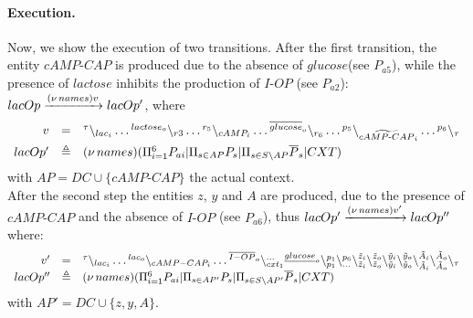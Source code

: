 \paragraph{Execution.}
Now, we show  the execution of two transitions. 
After the first transition, the entity $cAMP\textrm{-}CAP$ is produced due to the absence of  $glucose$(see $P_{a5}$), while the presence of $lactose$ inhibits the production of $I\textrm{-}OP$ (see $P_{a2}$): $lacOp \xrightarrow{(\nu\, names) v} lacOp'$,
where
{\small
$$
\begin{array}{rcl}
v & = & {}^{\tau} \backslash_{lac_i}\dots {}^{lactose_o} \backslash_{r3}\dots
 {}^{r_5} \backslash_{cAMP_i}\dots
  {}^{\overline{glucose}_o} \backslash_{r_6}
\dots {}^{p_5} \backslash_{\widetilde{cAMP\textrm{-}CAP}_i}\dots {}^{p_6} \backslash_{\tau}\\[5pt]
lacOp' & \triangleq & (\nu\, names) (\Pi_{i =1}^6 P_{ai} | \Pi_{s \in AP} P_s |   \Pi_{s \in S \backslash AP} \overline{P}_s| CXT)
\end{array}
$$ 
}
with $AP= DC\cup \{cAMP\textrm{-}CAP\}$  the actual context.\\
After the second step the entities $z$, $y$ and $A$ are produced, due to the presence of $cAMP\textrm{-}CAP$ and the absence of $I\textrm{-}OP$ (see $P_{a6}$), thus
$lacOp' \xrightarrow{(\nu\, names)v'} lacOp''$
where:
{\small
$$
\begin{array}{rcl}
v' & = & {}^{\tau} \backslash_{lac_i}\dots {}^{lac_o} \backslash_{cAMP-CAP_i}\dots {}^{\overline{I-OP}_o}
\backslash_{cxt_1}^{\dots}{}^{\underline{glucose}_o}\backslash_{p_1}^{p_1}
\backslash_{\dots}^{p_6}\backslash_{\tilde{z}_i}^{\tilde{z}_i}\backslash_{\tilde{z}_o}^{\tilde{z}_o}
\backslash_{\tilde{y}_i}^{\tilde{y}_i}\backslash_{\tilde{y}_o}^{\tilde{y}_o}\backslash_{\tilde{A}_i}^{\tilde{A}_i}\backslash_{\tilde{A}_o}^{\tilde{A}_o}\backslash_{\tau}\\
lacOp'' & \triangleq & (\nu\, names) (\Pi_{i =1}^{6} P_{ai} | \Pi_{s \in AP'} P_s |   \Pi_{s \in S \backslash AP'} \overline{P}_s| CXT)
\end{array}
$$
}
with $AP'= DC\cup \{z,y,A\} $.


